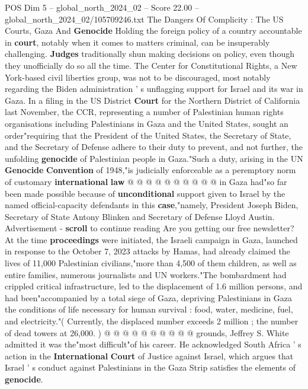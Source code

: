 \begin{textsample}{POS Dim 5 – global\_north\_2024\_02 – Score 22.00 – global\_north\_2024\_02/105709246.txt}  \label{ex:f5_pos_242}
The Dangers Of Complicity : The US Courts, Gaza And \textbf{Genocide} Holding the foreign policy of a country accountable in \textbf{court}, notably when it comes to matters criminal, can be insuperably challenging. \textbf{Judges} traditionally shun making decisions on policy, even though they unofficially do so all the time.
The Center for Constitutional Rights, a New York-based civil liberties group, was not to be discouraged, most notably regarding the Biden administration ' s unflagging support for Israel and its war in Gaza.
In a filing in the US District \textbf{Court} for the Northern District of California last November, the CCR, representing a number of Palestinian human rights organisations including Palestinians in Gaza and the United States, sought an order"requiring that the President of the United States, the Secretary of State, and the Secretary of Defense adhere to their duty to prevent, and not further, the unfolding \textbf{genocide} of Palestinian people in Gaza."Such a duty, arising in the UN \textbf{Genocide} \textbf{Convention} of 1948,"is judicially enforceable as a peremptory norm of customary \textbf{international} \textbf{law} @ @ @ @ @ @ @ @ @ @ in Gaza had"so far been made possible because of \textbf{unconditional} support given to Israel by the named official-capacity defendants in this \textbf{case},"namely, President Joseph Biden, Secretary of State Antony Blinken and Secretary of Defense Lloyd Austin.
Advertisement - \textbf{scroll} to continue reading Are you getting our free newsletter?
At the time \textbf{proceedings} were initiated, the Israeli campaign in Gaza, launched in response to the October 7, 2023 attacks by Hamas, had already claimed the lives of 11,000 Palestinian civilians,"more than 4,500 of them children, as well as entire families, numerous journalists and UN workers."The bombardment had crippled critical infrastructure, led to the displacement of 1.6 million persons, and had been"accompanied by a total siege of Gaza, depriving Palestinians in Gaza the conditions of life necessary for human survival : food, water, medicine, fuel, and electricity."( Currently, the displaced number exceeds 2 million ; the number of dead towers at 26,000. ) @ @ @ @ @ @ @ @ @ @ grounds, Jeffrey S.
White admitted it was the"most difficult"of his career.
He acknowledged South Africa ' s action in the \textbf{International} \textbf{Court} of Justice against Israel, which argues that Israel ' s conduct against Palestinians in the Gaza Strip satisfies the elements of \textbf{genocide}.

\end{textsample}
